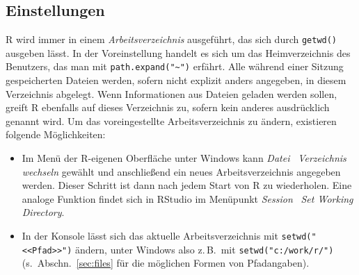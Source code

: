 \subsection{Einstellungen}
\label{sec:settings}

R wird immer in einem \emph{Arbeitsverzeichnis} ausgeführt, das sich durch \lstinline!getwd()! ausgeben lässt. In der Voreinstellung handelt es sich um das Heimverzeichnis des Benutzers, das man mit \lstinline!path.expand("~")! erfährt. Alle während einer Sitzung gespeicherten Dateien werden, sofern nicht explizit anders angegeben, in diesem Verzeichnis abgelegt. Wenn Informationen aus Dateien geladen werden sollen, greift R ebenfalls auf dieses Verzeichnis zu, sofern kein anderes ausdrücklich genannt wird. Um das voreingestellte Arbeitsverzeichnis zu ändern, existieren folgende Möglichkeiten:

\begin{itemize}
\item Im Menü der R-eigenen Oberfläche unter Windows kann \emph{Datei} \textrightarrow\ \emph{Verzeichnis wechseln} gewählt und anschließend ein neues Arbeitsverzeichnis angegeben werden. Dieser Schritt ist dann nach jedem Start von R zu wiederholen. Eine analoge Funktion findet sich in RStudio im Menüpunkt \emph{Session} \textrightarrow\ \emph{Set Working Directory}.
\item In der Konsole lässt sich das aktuelle Arbeitsverzeichnis mit \lstinline!setwd("<<Pfad>>")! ändern, unter Windows also z.\,B.\ mit \lstinline!setwd("c:/work/r/")! (s.\ Abschn.\ \ref{sec:files} für die möglichen Formen von Pfadangaben).
\end{itemize}


